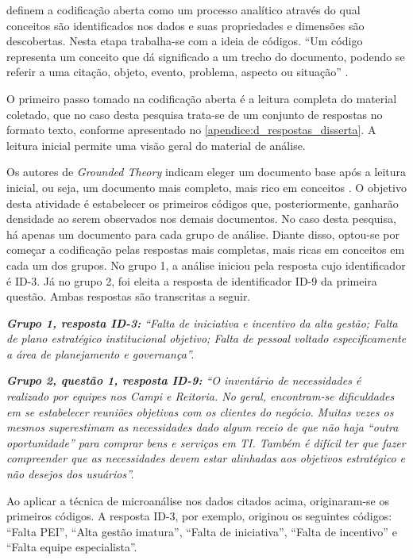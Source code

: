  definem a codificação aberta como um processo analítico através do qual conceitos são identificados nos dados e suas propriedades e dimensões são descobertas. Nesta etapa trabalha-se com a ideia de 
códigos. ``Um código representa um conceito que dá significado a um trecho do documento, podendo se referir a uma citação, objeto, evento, problema, aspecto ou situação'' \cite{schots:10}.

O primeiro passo tomado na codificação aberta é a leitura completa do material coletado, que no caso desta pesquisa trata-se de um conjunto de respostas no formato texto, conforme apresentado no \autoref{apendice:d_respostas_disserta}. A leitura inicial permite uma visão geral do material de análise.

Os autores de \textit{Grounded Theory} indicam eleger um documento base após a leitura inicial, ou seja, um documento mais completo, mais rico em conceitos \cite{strauss:87,corbin:98}. O objetivo desta atividade é estabelecer os primeiros códigos que, posteriormente, ganharão densidade ao serem observados nos demais documentos. No caso desta pesquisa, há apenas um documento para cada grupo de análise. Diante disso, optou-se por começar a codificação pelas respostas mais completas, mais ricas em conceitos em cada um dos grupos. No grupo 1, a análise iniciou pela resposta cujo identificador é ID-3. Já no grupo 2, foi eleita a resposta de identificador ID-9 da primeira questão. Ambas respostas são transcritas a seguir.

\textit{\textbf{Grupo 1, resposta ID-3:} ``Falta de iniciativa e incentivo da alta gestão; Falta de plano estratégico institucional objetivo; Falta de pessoal voltado especificamente a área de planejamento e governança''.}

\textit{\textbf{Grupo 2, questão 1, resposta ID-9:} ``O inventário de necessidades é realizado por equipes nos Campi e Reitoria. No geral, encontram-se dificuldades em se estabelecer reuniões objetivas com os clientes do negócio. Muitas vezes os mesmos superestimam as necessidades dado algum receio de que não haja ``outra oportunidade''  para comprar bens e serviços em TI. Também é difícil ter que fazer compreender que as necessidades devem estar alinhadas aos objetivos estratégico e não desejos dos usuários''.}

Ao aplicar a técnica de microanálise nos dados citados acima, originaram-se os primeiros códigos. A resposta ID-3, por exemplo, originou os seguintes códigos: ``Falta PEI'', ``Alta gestão imatura'', ``Falta de iniciativa'', ``Falta de incentivo'' e ``Falta equipe especialista''.

